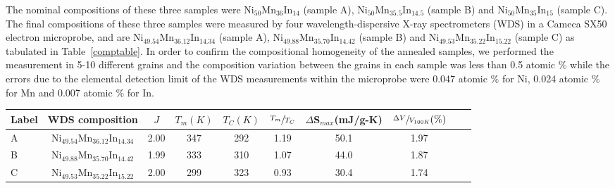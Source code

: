 \documentclass[sort&compress,twocolumn,3p]{elsarticle}
\begin{document}
The nominal compositions of these three samples were Ni$_{50}$Mn$_{36}$In$_{14}$ (sample A), Ni$_{50}$Mn$_{35.5}$In$_{14.5}$ (sample B) and Ni$_{50}$Mn$_{35}$In$_{15}$ (sample C).
The final compositions of these three samples were measured by four wavelength-dispersive X-ray spectrometers (WDS) in a Cameca SX50 electron microprobe, and are Ni$_{49.54}$Mn$_{36.12}$In$_{14.34}$ (sample A), Ni$_{49.88}$Mn$_{35.70}$In$_{14.42}$ (sample B) and Ni$_{49.53}$Mn$_{35.22}$In$_{15.22}$ (sample C) as tabulated in Table~\ref{comptable}.
In order to confirm the compositional homogeneity of the annealed samples, we performed the measurement in 5-10 different grains and the composition variation between the grains in each sample was less than 0.5 atomic \%
while the errors due to the elemental detection limit of the WDS measurements within the microprobe were 0.047 atomic \% for Ni, 0.024 atomic \% for Mn and 0.007 atomic \% for In.

\begin{table*}
\centering
\begin{tabular}{l|ccccccccc}
\hline\hline
Label&WDS composition&$J$&$T_{m}(K)$&$T_C(K)$&$\sfrac{T_m}{T_C}$ & $\Delta$S$_{max}$(mJ/g-K)&$\sfrac{\Delta V}{V_{100K}}(\%)$\\
\hline
A	&Ni$_{49.54}$Mn$_{36.12}$In$_{14.34}$	&2.00	&347	&292	&1.19 &	50.1 & 1.97 \\
B	&Ni$_{49.88}$Mn$_{35.70}$In$_{14.42}$	&1.99	&333	&310	&1.07 &	44.0 & 1.87 \\
C	&Ni$_{49.53}$Mn$_{35.22}$In$_{15.22}$	&2.00	&299	&323	&0.93 &	30.4 & 1.74 \\
\hline\hline
\end{tabular}
\caption{The corresponding experimental results of our three samples are shown.
		$J$ and $T_C$ are estimated from the high-temperature Curie-Weiss fits, and
		$T_{m}$ (martensitic transition temperature) is defined as the maximum position of the specific heat measured while heating.
The volume changes, $\Delta V=V_{400K}-V_{100K}$, are determined from the X-ray diffraction.}
\label{comptable}
\end{table*}
\end{document}
